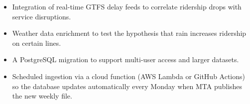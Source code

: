 \begin{itemize}
    \item Integration of real-time GTFS delay feeds to correlate ridership drops
          with service disruptions.
    \item Weather data enrichment to test the hypothesis that rain increases
          ridership on certain lines.
    \item A PostgreSQL migration to support multi-user access and larger datasets.
    \item Scheduled ingestion via a cloud function (AWS Lambda or GitHub Actions)
          so the database updates automatically every Monday when MTA publishes
          the new weekly file.
\end{itemize}
